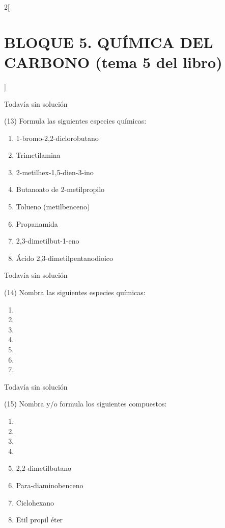 \documentclass[10pt]{article}
\begin{document}
\begin{multicols}{2}[
  \section{BLOQUE 5. QUÍMICA DEL CARBONO (tema 5 del libro)}
  ]
\begin{solution}[print=false]
  Todavía sin solución
\end{solution}

\begin{exercise}
  (13) Formula las siguientes especies químicas:
  \begin{enumerate}
    \item 1-bromo-2,2-diclorobutano
    \item Trimetilamina
    \item 2-metilhex-1,5-dien-3-ino
    \item Butanoato de 2-metilpropilo
    \item Tolueno (metilbenceno)
    \item Propanamida
    \item 2,3-dimetilbut-1-eno
    \item Ácido 2,3-dimetilpentanodioico
  \end{enumerate}
\end{exercise}

\begin{solution}[print=false]
  Todavía sin solución
\end{solution}

\begin{exercise}
  (14) Nombra las siguientes especies químicas:
  \begin{enumerate}
    \item {}
    \item {}
    \item {}
    \item {}
    \item {}
    \item {}
    \item {}
  \end{enumerate}
\end{exercise}

\begin{solution}[print=false]
  Todavía sin solución
\end{solution}

\begin{exercise}
  (15) Nombra y/o formula los siguientes compuestos:
  \begin{enumerate}
    \item {}
    \item {}
    \item {}
    \item {}
    \item 2,2-dimetilbutano
    \item Para-diaminobenceno
    \item Ciclohexano
    \item Etil propil éter
  \end{enumerate}
\end{exercise}


\end{multicols}
\end{document}
